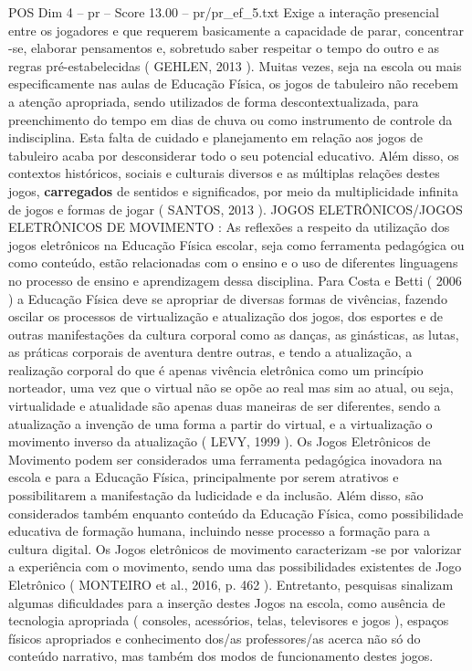 \begin{textsample}{POS Dim 4 – pr – Score 13.00 – pr/pr\_ef\_5.txt}
Exige a interação presencial entre os jogadores e que requerem basicamente a capacidade de parar, concentrar -se, elaborar pensamentos e, sobretudo saber respeitar o tempo do outro e as regras pré-estabelecidas ( GEHLEN, 2013 ).
Muitas vezes, seja na escola ou mais especificamente nas aulas de Educação Física, os jogos de tabuleiro não recebem a atenção apropriada, sendo utilizados de forma descontextualizada, para preenchimento do tempo em dias de chuva ou como instrumento de controle da indisciplina.
Esta falta de cuidado e planejamento em relação aos jogos de tabuleiro acaba por desconsiderar todo o seu potencial educativo.
Além disso, os contextos históricos, sociais e culturais diversos e as múltiplas relações destes jogos, \textbf{carregados} de sentidos e significados, por meio da multiplicidade infinita de jogos e formas de jogar ( SANTOS, 2013 ).
JOGOS ELETRÔNICOS/JOGOS ELETRÔNICOS DE MOVIMENTO : As reflexões a respeito da utilização dos jogos eletrônicos na Educação Física escolar, seja como ferramenta pedagógica ou como conteúdo, estão relacionadas com o ensino e o uso de diferentes linguagens no processo de ensino e aprendizagem dessa disciplina.
Para Costa e Betti ( 2006 ) a Educação Física deve se apropriar de diversas formas de vivências, fazendo oscilar os processos de virtualização e atualização dos jogos, dos esportes e de outras manifestações da cultura corporal como as danças, as ginásticas, as lutas, as práticas corporais de aventura dentre outras, e tendo a atualização, a realização corporal do que é apenas vivência eletrônica como um princípio norteador, uma vez que o virtual não se opõe ao real mas sim ao atual, ou seja, virtualidade e atualidade são apenas duas maneiras de ser diferentes, sendo a atualização a invenção de uma forma a partir do virtual, e a virtualização o movimento inverso da atualização ( LEVY, 1999 ).
Os Jogos Eletrônicos de Movimento podem ser considerados uma ferramenta pedagógica inovadora na escola e para a Educação Física, principalmente por serem atrativos e possibilitarem a manifestação da ludicidade e da inclusão.
Além disso, são considerados também enquanto conteúdo da Educação Física, como possibilidade educativa de formação humana, incluindo nesse processo a formação para a cultura digital.
Os Jogos eletrônicos de movimento caracterizam -se por valorizar a experiência com o movimento, sendo uma das possibilidades existentes de Jogo Eletrônico ( MONTEIRO et al., 2016, p. 462 ).
Entretanto, pesquisas sinalizam algumas dificuldades para a inserção destes Jogos na escola, como ausência de tecnologia apropriada ( consoles, acessórios, telas, televisores e jogos ), espaços físicos apropriados e conhecimento dos/as professores/as acerca não só do conteúdo narrativo, mas também dos modos de funcionamento destes jogos.

\end{textsample}
